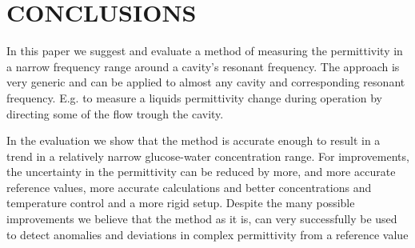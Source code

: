 \documentclass[10pt,final,conference,a4paper,twocolumn]{IEEEtran_AntennEMB_GigaHertz2016}
\begin{document}



\section{CONCLUSIONS}
In this paper we suggest and evaluate a method of measuring the permittivity in a narrow frequency range around a cavity's resonant frequency. The approach is very generic and can be applied to almost any cavity and corresponding resonant frequency. E.g. to measure a liquids permittivity change during operation by directing some of the flow trough the cavity.

In the evaluation we show that the method is accurate enough to result in a trend in a relatively narrow glucose-water concentration range. For improvements, the uncertainty in the permittivity can be reduced by more, and more accurate reference values, more accurate calculations and better concentrations and temperature control and a more rigid setup. Despite the many possible improvements we believe that the method as it is, can very successfully be used to detect anomalies and deviations in complex permittivity from a reference value







%
%
\end{document}

